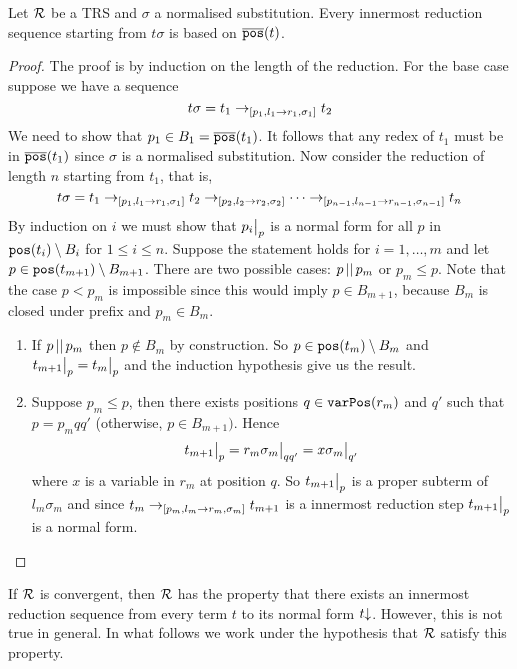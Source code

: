 \begin{proposition}\label{proposition:innermost-based-on-t}
	Let $\mathcal{R}$ be a TRS and $\sigma$ a normalised substitution. Every innermost reduction sequence starting from $t\sigma$ is based on $\overline{\mathtt{pos}}(t)$.
	\begin{proof}
		The proof is by induction on the length of the reduction. For the base case suppose we have a sequence
		$$ t\sigma = t_1 \rightarrow_{[p_1, l_1 \rightarrow r_1, \sigma_1]} t_2 $$
		We need to show that $p_1 \in B_1 = \overline{\mathtt{pos}}(t_1)$. It follows that any redex of $t_1$ must be in $\overline{\mathtt{pos}}(t_1)$ since $\sigma$ is a normalised substitution.
		Now consider the reduction of length $n$ starting from $t_1$, that is,
		$$t \sigma = t_1 \rightarrow_{[p_1, l_1 \rightarrow r_1, \sigma_1]} t_2 \rightarrow_{[p_2, l_2 \rightarrow r_2, \sigma_2]} \cdots \rightarrow_{[p_{n-1}, l_{n-1} \rightarrow r_{n-1}, \sigma_{n-1}]} t_n$$
		By induction on $i$ we must show that $\restr{p_i}{p}$ is a normal form for all $p$ in $\mathtt{pos}(t_i)\setminus B_i$ for $1 \leq i \leq n$. Suppose the statement holds for $i = 1, \dots, m$ and let $p \in \mathtt{pos}(t_{m+1}) \setminus B_{m+1}$. There are two possible cases: $p\,||\,p_m$ or $p_m \leq p$. Note that the case $p < p_m$ is impossible since this would imply $p \in B_{m+1}$, because $B_m$ is closed under prefix and $p_m \in B_m$.
		\begin{enumerate}
			\item If $p\,||\,p_m$ then $p \notin B_m$ by construction. So $p \in \mathtt{pos}(t_m) \setminus B_m$ and $\restr{t_{m+1}}{p} = \restr{t_m}{p}$ and the induction hypothesis give us the result.
			\item Suppose $p_m \leq p$, then there exists positions $q \in \mathtt{varPos}(r_m)$ and $q'$ such that $p = p_m q q'$ (otherwise, $p \in B_{m+1})$. Hence
			      $$\restr{t_{m+1}}{p} = \restr{r_m\sigma_m}{qq'} = \restr{x\sigma_m}{q'}$$
			      where $x$ is a variable in $r_m$ at position $q$. So $\restr{t_{m+1}}{p}$ is a proper subterm of $l_m\sigma_m$ and since $t_m \rightarrow_{[p_m, l_m \rightarrow r_m, \sigma_m]}t_{m+1}$ is a innermost reduction step $\restr{t_{m+1}}{p}$ is a normal form.
		\end{enumerate}
	\end{proof}
\end{proposition}

If $\mathcal{R}$ is convergent, then $\mathcal{R}$ has the property that there exists an innermost reduction sequence from every term $t$ to its normal form $t\mathord{\downarrow}$. However, this is not true in general. In what follows we work under the hypothesis that $\mathcal{R}$ satisfy this property.

